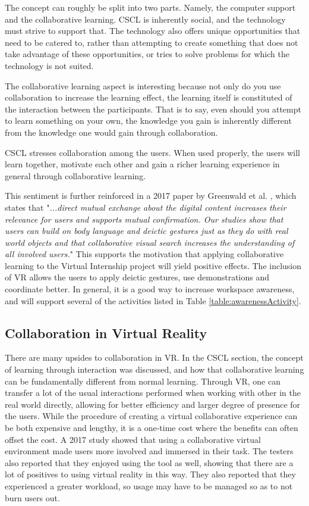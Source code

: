 The concept can roughly be split into two parts. Namely, the computer support and the collaborative learning. CSCL is inherently social, and the technology must strive to support that. The technology also offers unique opportunities that need to be catered to, rather than attempting to create something that does not take advantage of these opportunities, or tries to solve problems for which the technology is not suited.

The collaborative learning aspect is interesting because not only do you use collaboration to increase the learning effect, the learning itself is constituted of the interaction between the participants\cite{stahl2006computer}. That is to say, even should you attempt to learn something on your own, the knowledge you gain is inherently different from the knowledge one would gain through collaboration.


CSCL stresses collaboration among the users. When used properly, the users will learn together, motivate each other and gain a richer learning experience in general through collaborative learning.

This sentiment is further reinforced in a 2017 paper by Greenwald et al. \cite{greenwald2017technology}, which states that "\textit{...direct mutual exchange about the digital content increases their relevance for users and supports mutual confirmation. Our studies show that users can build on body language and deictic gestures just as they do with real world objects and that collaborative visual search increases the understanding of all involved users.}" This supports the motivation that applying collaborative learning to the Virtual Internship project will yield positive effects. The inclusion of VR allows the users to apply deictic gestures, use demonstrations and coordinate better. In general, it is a good way to increase workspace awareness, and will support several of the activities listed in Table \ref{table:awarenessActivity}.

\subsection{Collaboration in Virtual Reality}
\label{sec:collabVR}
There are many upsides to collaboration in VR. In the CSCL section, the concept of learning through interaction was discussed, and how that collaborative learning can be fundamentally different from normal learning. Through VR, one can transfer a lot of the usual interactions performed when working with other in the real world directly, allowing for better efficiency and larger degree of presence for the users\cite{greenwald2017technology}. While the procedure of creating a virtual collaborative experience can be both expensive and lengthy, it is a one-time cost where the benefits can often offset the cost.  A 2017 study showed that using a collaborative virtual environment made users more involved and immersed in their task. The testers also reported that they enjoyed using the tool as well, showing that there are a lot of positives to using virtual reality in this way. They also reported that they experienced a greater workload, so usage may have to be managed so as to not burn users out\cite{madathil2017investigation}.

